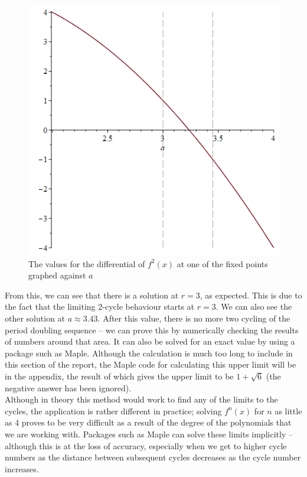\documentclass[12pt]{article}
\begin{document}
\begin{figure}[H]
	\centering
	\includegraphics[scale=0.4]{1sqrt5lim.png}
	\caption{The values for the differential of $f^2(x)$ at one of the fixed points graphed against $a$}
\end{figure}
From this, we can see that there is a solution at $r=3$, as expected. This is due to the fact that the limiting 2-cycle behaviour starts at $r=3$. We can also see the other solution at $a\approx3.43$. After this value, there is no more two cycling of the period doubling sequence -- we can prove this by numerically checking the results of numbers around that area. It can also be solved for an exact value by using a package such as Maple.
\newpage
Although the calculation is much too long to include in this section of the report, the Maple code for calculating this upper limit will be in the appendix, the result of which gives the upper limit to be $1+\sqrt{6}$ (the negative answer has been ignored).
\\Although in theory this method would work to find any of the limits to the cycles, the application is rather different in practice; solving $f^n(x)$ for $n$ as little as 4 proves to be very difficult as a result of the degree of the polynomials that we are working with.
Packages such as Maple can solve these limits implicitly -- although this is at the loss of accuracy, especially when we get to higher cycle numbers as the distance between subsequent cycles decreases as the cycle number increases.
\end{document}
